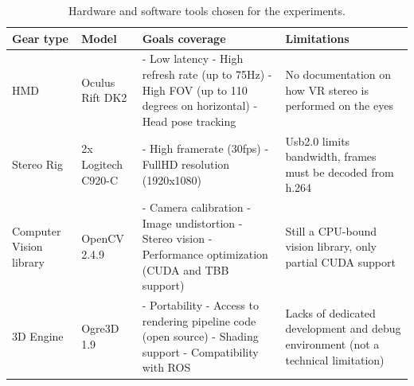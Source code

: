 \begin{table}[]
\centering
\begin{tabular}{llll}
\hline
Gear type                       & Model                                & Goals coverage                                                                                                & Limitations                                                                                            \\ \hline
\multicolumn{1}{|l|}{HMD}       & \multicolumn{1}{l|}{Oculus Rift DK2} & \multicolumn{1}{p{0.4\linewidth}|}{
- Low latency \newline
- High refresh rate (up to 75Hz) \newline
- High FOV (up to 110 degrees on horizontal)\newline
- Head pose tracking
}                                                & \multicolumn{1}{p{0.2\linewidth}|}{No documentation on how VR stereo is performed on the eyes}                        \\ \hline
\multicolumn{1}{|l|}{Stereo Rig}    & \multicolumn{1}{l|}{2x Logitech C920-C}   & \multicolumn{1}{p{0.4\linewidth}|}{
- High framerate (30fps)\newline
- FullHD resolution (1920x1080)
}                                            & \multicolumn{1}{p{0.2\linewidth}|}{Usb2.0 limits bandwidth, frames must be decoded from h.264}                        \\ \hline
\multicolumn{1}{|p{0.1\linewidth}|}{Computer Vision library}    & \multicolumn{1}{l|}{OpenCV 2.4.9}    & \multicolumn{1}{p{0.4\linewidth}|}{
- Camera calibration \newline
- Image undistortion \newline
- Stereo vision \newline
- Performance optimization (CUDA and TBB support)
} & \multicolumn{1}{p{0.2\linewidth}|}{Still a CPU-bound vision library, only partial CUDA support}                                                  \\ \hline
\multicolumn{1}{|l|}{3D Engine} & \multicolumn{1}{l|}{Ogre3D 1.9}      & \multicolumn{1}{p{0.4\linewidth}|}{
- Portability \newline
- Access to rendering pipeline code (open source) \newline
- Shading support \newline
- Compatibility with ROS
}   & \multicolumn{1}{p{0.2\linewidth}|}{Lacks of dedicated development and debug environment (not a technical limitation)} \\ \hline
\end{tabular}
\caption{Hardware and software tools chosen for the experiments.}
\label{gear_table}
\end{table}

